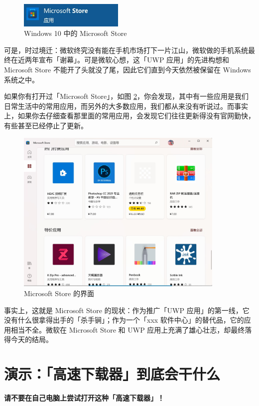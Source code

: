 \begin{figure}[H]
  \centering
  \includegraphics[width=5cm]{assets/MS_Store_1.jpg}
  \caption{Windows 10 中的 Microsoft Store}
  \label{ms-store-in-windows-10}
\end{figure}

可是，时过境迁：微软终究没有能在手机市场打下一片江山，微软做的手机系统最终在近两年宣布「谢幕」。可是微软心想，这「UWP 应用」的先进构想和 Microsoft Store 不能开了头就没了尾，因此它们直到今天依然被保留在 Windows 系统之中。

如果你有打开过「Microsoft Store」，如图 \ref{ms-store}，你会发现，其中有一些应用是我们日常生活中的常用应用，而另外的大多数应用，我们都从来没有听说过。而事实上，如果你去仔细查看那里面的常用应用，会发现它们往往更新得没有官网勤快，有些甚至已经停止了更新。

\begin{figure}[htb!]
  \centering
  \includegraphics[width=10cm]{assets/MS_Store_2.jpg}
  \caption{Microsoft Store 的界面}
  \label{ms-store}
\end{figure}

事实上，这就是 Microsoft Store 的现状：作为推广「UWP 应用」的第一线，它没有什么很拿得出手的「杀手锏」；作为一个「xxx 软件中心」的替代品，它的应用相当不全。微软在 Microsoft Store 和 UWP 应用上充满了雄心壮志，却最终落得今天的结局。

\section{演示：「高速下载器」到底会干什么}

\begin{warning}
  \textbf{请不要在自己电脑上尝试打开这种「高速下载器」！}
\end{warning}

